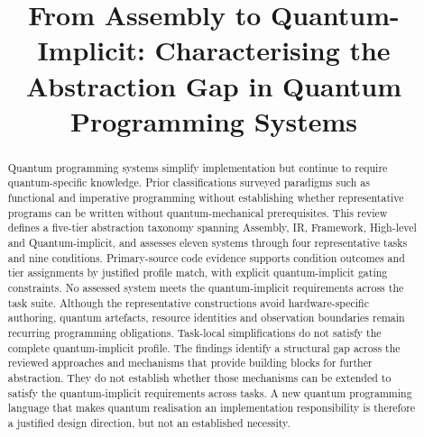 \documentclass[10pt,conference]{IEEEtran}
\begin{document}
    \title{From Assembly to Quantum-Implicit: Characterising the Abstraction Gap in Quantum Programming Systems}
    \unless\ifanon
    \author{
    }
    \fi

    \maketitle

    \begin{abstract}
        Quantum programming systems simplify implementation but continue to require quantum-specific knowledge.
        Prior classifications surveyed paradigms such as functional and imperative programming without establishing whether representative programs can be written without quantum-mechanical prerequisites.
        This review defines a five-tier abstraction taxonomy spanning Assembly, IR, Framework, High-level and Quantum-implicit, and assesses eleven systems through four representative tasks and nine conditions.
        Primary-source code evidence supports condition outcomes and tier assignments by justified profile match, with explicit quantum-implicit gating constraints.
        No assessed system meets the quantum-implicit requirements across the task suite.
        Although the representative constructions avoid hardware-specific authoring, quantum artefacts, resource identities and observation boundaries remain recurring programming obligations.
        Task-local simplifications do not satisfy the complete quantum-implicit profile.
        The findings identify a structural gap across the reviewed approaches and mechanisms that provide building blocks for further abstraction.
        They do not establish whether those mechanisms can be extended to satisfy the quantum-implicit requirements across tasks.
        A new quantum programming language that makes quantum realisation an implementation responsibility is therefore a justified design direction, but not an established necessity.
    \end{abstract}

    
    \printbibliography
\end{document}
